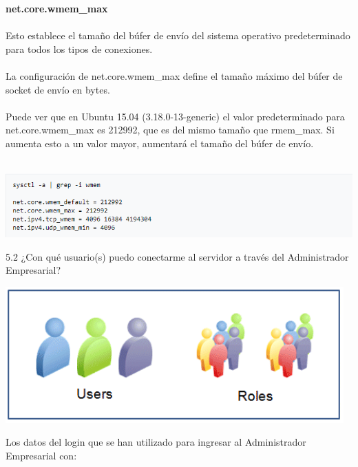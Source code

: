 {\bfseries  net.core.wmem\_max}
\\
\\Esto establece el tamaño del búfer de envío del sistema operativo predeterminado para todos los tipos de conexiones.
\\
\\La configuración de net.core.wmem\_max define el tamaño máximo del búfer de socket de envío en bytes.
\\
\\
Puede ver que en Ubuntu 15.04 (3.18.0-13-generic) el valor predeterminado para net.core.wmem\_max es 212992, que es del mismo tamaño que rmem\_max. Si aumenta esto a un valor mayor, aumentará el tamaño del búfer de envío.\\
\\
	\begin{center}
		\includegraphics[width=17cm]{./Imagenes/p} 
	\end{center} 

5.2 ¿Con qué usuario(s) puedo conectarme al servidor a través del Administrador
Empresarial?
	\begin{center}
		\includegraphics[width=13cm]{./Imagenes/users-oracle} 
	\end{center} 

	Los datos del login que se han utilizado para ingresar al Administrador Empresarial con:

